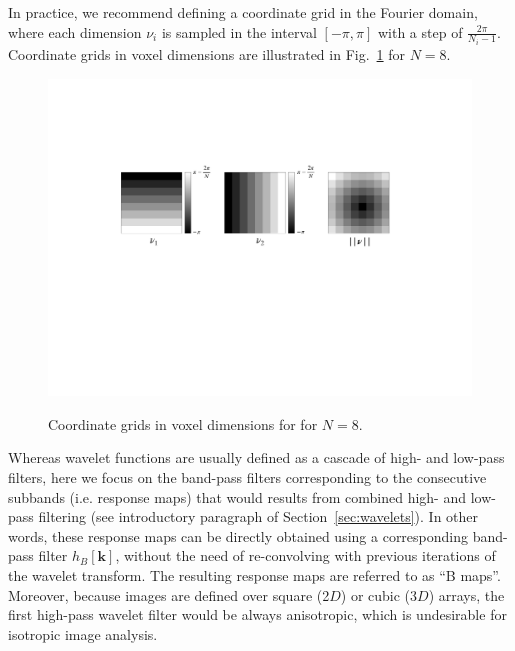 \documentclass[fleqn,a4paper,oneside,openany]{book}
\begin{document}
In practice, we recommend defining a coordinate grid in the Fourier domain, where each dimension $\nu_i$ is sampled in the interval $[-\pi,\pi]$ with a step of $\frac{2\pi}{N_i-1}$.
Coordinate grids in voxel dimensions are illustrated in Fig.~\ref{fig:coordinateGridsFourier} for $N=8$.
%
\begin{figure}
\centering
\includegraphics[trim = 0 0 0 0, clip, width=.8\linewidth]{coordinateGridsFourier.pdf}\\
\caption{Coordinate grids in voxel dimensions for for $N=8$.}
  \label{fig:coordinateGridsFourier}
\end{figure}
%

Whereas wavelet functions are usually defined as a cascade of high- and low-pass filters, here we focus on the band-pass filters corresponding to the consecutive subbands (i.e. response maps) that would results from combined high- and low- pass filtering (see introductory paragraph of Section~\ref{sec:wavelets}). In other words, these response maps can be directly obtained using a corresponding band-pass filter $h_B[\boldsymbol{k}]$, without the need of re-convolving with previous iterations of the wavelet transform. The resulting response maps are referred to as ``B maps''.
Moreover, because images are defined over square (2$D$) or cubic (3$D$) arrays, the first high-pass wavelet filter would be always anisotropic, which is undesirable for isotropic image analysis.
\end{document}
